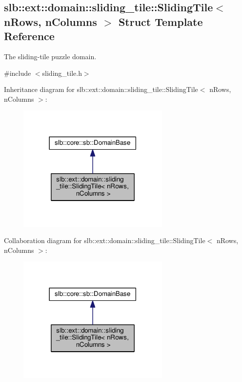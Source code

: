 \hypertarget{structslb_1_1ext_1_1domain_1_1sliding__tile_1_1SlidingTile}{}\subsection{slb\+:\+:ext\+:\+:domain\+:\+:sliding\+\_\+tile\+:\+:Sliding\+Tile$<$ n\+Rows, n\+Columns $>$ Struct Template Reference}
\label{structslb_1_1ext_1_1domain_1_1sliding__tile_1_1SlidingTile}


The sliding-\/tile puzzle domain.  




{\ttfamily \#include $<$sliding\+\_\+tile.\+h$>$}



Inheritance diagram for slb\+:\+:ext\+:\+:domain\+:\+:sliding\+\_\+tile\+:\+:Sliding\+Tile$<$ n\+Rows, n\+Columns $>$\+:\nopagebreak
\begin{figure}[H]
\begin{center}
\leavevmode
\includegraphics[width=213pt]{structslb_1_1ext_1_1domain_1_1sliding__tile_1_1SlidingTile__inherit__graph}
\end{center}
\end{figure}


Collaboration diagram for slb\+:\+:ext\+:\+:domain\+:\+:sliding\+\_\+tile\+:\+:Sliding\+Tile$<$ n\+Rows, n\+Columns $>$\+:\nopagebreak
\begin{figure}[H]
\begin{center}
\leavevmode
\includegraphics[width=213pt]{structslb_1_1ext_1_1domain_1_1sliding__tile_1_1SlidingTile__coll__graph}
\end{center}
\end{figure}
